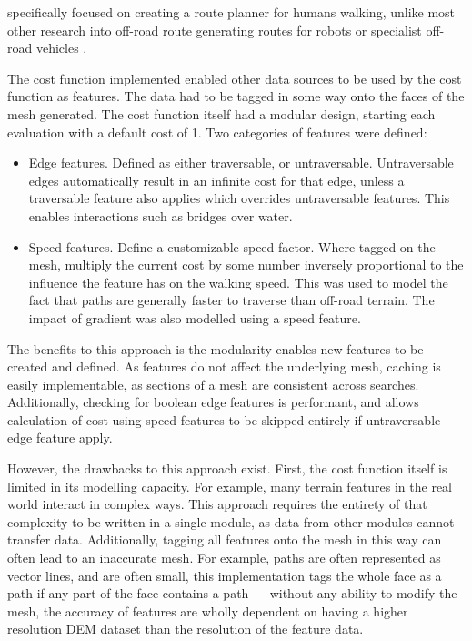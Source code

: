 \documentclass[12pt]{article}
\begin{document}
\autocite{evans2023tsr} specifically focused on creating a route planner for humans walking, unlike most other research into off-road route generating routes for robots or specialist off-road vehicles \autocite{perkins2013fielddstar,zhao2024searchrescue}.

The cost function implemented enabled other data sources to be used by the cost function as features. The data had to be tagged in some way onto the faces of the mesh generated. The cost function itself had a modular design, starting each evaluation with a default cost of 1. Two categories of features were defined:

\begin{itemize}
  \item Edge features. Defined as either traversable, or untraversable. Untraversable edges automatically result in an infinite cost for that edge, unless a traversable feature also applies which overrides untraversable features. This enables interactions such as bridges over water.
  \item Speed features. Define a customizable speed-factor. Where tagged on the mesh, multiply the current cost by some number inversely proportional to the influence the feature has on the walking speed. This was used to model the fact that paths are generally faster to traverse than off-road terrain. The impact of gradient was also modelled using a speed feature.
\end{itemize}

The benefits to this approach is the modularity enables new features to be created and defined. As features do not affect the underlying mesh, caching is easily implementable, as sections of a mesh are consistent across searches. Additionally, checking for boolean edge features is performant, and allows calculation of cost using speed features to be skipped entirely if untraversable edge feature apply.

However, the drawbacks to this approach exist. First, the cost function itself is limited in its modelling capacity. For example, many terrain features in the real world interact in complex ways. This approach requires the entirety of that complexity to be written in a single module, as data from other modules cannot transfer data. Additionally, tagging all features onto the mesh in this way can often lead to an inaccurate mesh. For example, paths are often represented as vector lines, and are often small, this implementation tags the whole face as a path if any part of the face contains a path --- without any ability to modify the mesh, the accuracy of features are wholly dependent on having a higher resolution DEM dataset than the resolution of the feature data.
\end{document}
